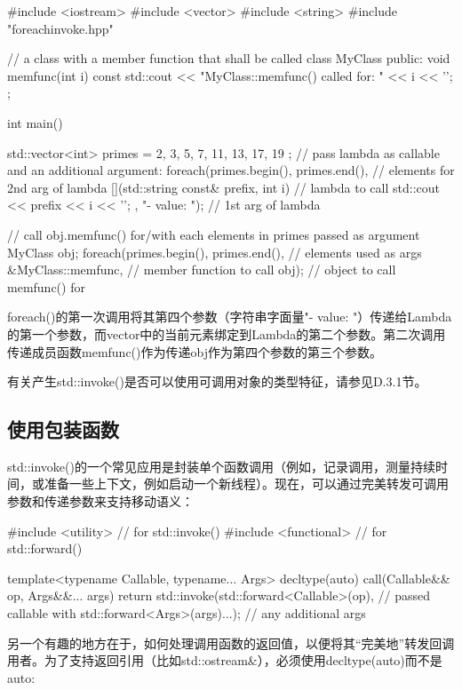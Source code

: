 \begin{cpp}
#include <iostream>
#include <vector>
#include <string>
#include "foreachinvoke.hpp"

// a class with a member function that shall be called
class MyClass {
	public:
	void memfunc(int i) const {
		std::cout << "MyClass::memfunc() called for: " << i << '\n';
	}
};

int main()
{
	std::vector<int> primes = { 2, 3, 5, 7, 11, 13, 17, 19 };
	// pass lambda as callable and an additional argument:
	foreach(primes.begin(), primes.end(), // elements for 2nd arg of lambda
			[](std::string const& prefix, int i) { // lambda to call
				std::cout << prefix << i << '\n';
			},
			"- value: "); // 1st arg of lambda

	// call obj.memfunc() for/with each elements in primes passed as argument
	MyClass obj;
	foreach(primes.begin(), primes.end(), // elements used as args
			&MyClass::memfunc, // member function to call
			obj); // object to call memfunc() for
}
\end{cpp}

foreach()的第一次调用将其第四个参数（字符串字面量"- value: "）传递给Lambda的第一个参数，而vector中的当前元素绑定到Lambda的第二个参数。第二次调用传递成员函数memfunc()作为传递obj作为第四个参数的第三个参数。

有关产生std::invoke()是否可以使用可调用对象的类型特征，请参见D.3.1节。

\subsection{使用包装函数}

std::invoke()的一个常见应用是封装单个函数调用（例如，记录调用，测量持续时间，或准备一些上下文，例如启动一个新线程）。现在，可以通过完美转发可调用参数和传递参数来支持移动语义：

\begin{cpp}
#include <utility> // for std::invoke()
#include <functional> // for std::forward()

template<typename Callable, typename... Args>
decltype(auto) call(Callable&& op, Args&&... args)
{
	return std::invoke(std::forward<Callable>(op), // passed callable with
					   std::forward<Args>(args)...); // any additional args
}
\end{cpp}

另一个有趣的地方在于，如何处理调用函数的返回值，以便将其“完美地”转发回调用者。为了支持返回引用（比如std::ostream\&），必须使用decltype(auto)而不是auto:

